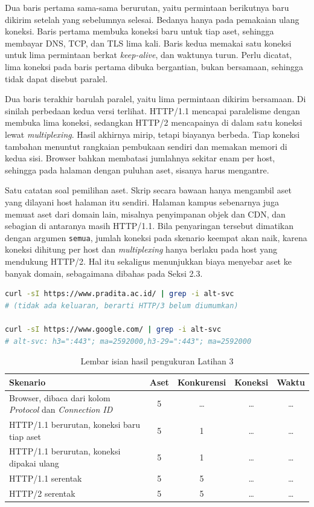 Dua baris pertama sama-sama berurutan, yaitu permintaan berikutnya baru dikirim
setelah yang sebelumnya selesai. Bedanya hanya pada pemakaian ulang koneksi.
Baris pertama membuka koneksi baru untuk tiap aset, sehingga membayar DNS, TCP,
dan TLS lima kali. Baris kedua memakai satu koneksi untuk lima permintaan
berkat \textit{keep-alive}, dan waktunya turun. Perlu dicatat,
lima koneksi pada baris pertama dibuka bergantian, bukan bersamaan, sehingga
tidak dapat disebut paralel.

Dua baris terakhir barulah paralel, yaitu lima permintaan dikirim bersamaan.
Di sinilah perbedaan kedua versi terlihat. HTTP/1.1 mencapai paralelisme dengan
membuka lima koneksi, sedangkan HTTP/2 mencapainya di dalam satu koneksi lewat
\textit{multiplexing}. Hasil akhirnya mirip, tetapi biayanya berbeda.
Tiap koneksi tambahan menuntut rangkaian pembukaan sendiri dan memakan memori di
kedua sisi. Browser bahkan membatasi jumlahnya sekitar enam per host, sehingga
pada halaman dengan puluhan aset, sisanya harus mengantre.


Satu catatan soal pemilihan aset. Skrip  secara
bawaan hanya mengambil aset yang dilayani host halaman itu sendiri. Halaman
kampus sebenarnya juga memuat aset dari domain lain, misalnya penyimpanan objek
dan CDN, dan sebagian di antaranya masih HTTP/1.1. Bila penyaringan tersebut
dimatikan dengan argumen \texttt{semua}, jumlah koneksi pada skenario keempat
akan naik, karena koneksi dihitung per host dan \textit{multiplexing} hanya
berlaku pada host yang mendukung HTTP/2. Hal itu sekaligus menunjukkan biaya
menyebar aset ke banyak domain, sebagaimana dibahas pada Seksi 2.3.
\begin{lstlisting}[language=bash, caption={Memeriksa dukungan HTTP/3 lewat header \texttt{alt-svc}}, label={lst:altsvc}]
curl -sI https://www.pradita.ac.id/ | grep -i alt-svc
# (tidak ada keluaran, berarti HTTP/3 belum diumumkan)

curl -sI https://www.google.com/ | grep -i alt-svc
# alt-svc: h3=":443"; ma=2592000,h3-29=":443"; ma=2592000
\end{lstlisting}


\begin{table}[!htb]
  \centering
  \caption{Lembar isian hasil pengukuran Latihan 3}
  \label{tab:lat2-hasil}
  \begin{tabularx}{\textwidth}{Xcccc}
    \hline
    \textbf{Skenario} & \textbf{Aset} & \textbf{Konkurensi} & \textbf{Koneksi} & \textbf{Waktu} \\
    \hline
    Browser, dibaca dari kolom \emph{Protocol} dan \emph{Connection ID} & 5 & \dots & \dots & \dots \\
    \hline
    HTTP/1.1 berurutan, koneksi baru tiap aset & 5 & 1 & \dots & \dots \\
    \hline
    HTTP/1.1 berurutan, koneksi dipakai ulang & 5 & 1 & \dots & \dots \\
    \hline
    HTTP/1.1 serentak & 5 & 5 & \dots & \dots \\
    \hline
    HTTP/2 serentak & 5 & 5 & \dots & \dots \\
    \hline
  \end{tabularx}
\end{table}

